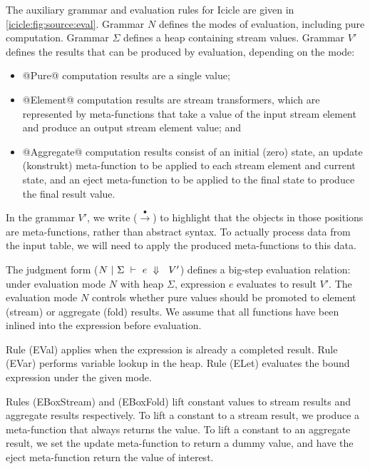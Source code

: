 The auxiliary grammar and evaluation rules for Icicle are given in \cref{icicle:fig:source:eval}.
Grammar $N$ defines the modes of evaluation, including pure computation.
Grammar $\Sigma$ defines a heap containing stream values.
Grammar $V'$ defines the results that can be produced by evaluation, depending on the mode:
\begin{itemize}
\item
@Pure@ computation results are a single value;
\item
@Element@ computation results are stream transformers, which are represented by meta-functions that take a value of the input stream element and produce an output stream element value; and
\item
@Aggregate@ computation results consist of an initial (zero) state, an update (konstrukt) meta-function to be applied to each stream element and current state, and an eject meta-function to be applied to the final state to produce the final result value.
\end{itemize}



In the grammar $V'$, we write ($\stackrel{\bullet}{\to}$) to highlight that the objects in those positions are meta-functions, rather than abstract syntax.
To actually process data from the input table, we will need to apply the produced meta-functions to this data.

The judgment form ($N~|~\Sigma~\vdash~e~\Downarrow~~V'$) defines a big-step evaluation relation: under evaluation mode $N$ with heap $\Sigma$, expression $e$ evaluates to result $V'$.
The evaluation mode $N$ controls whether pure values should be promoted to element (stream) or aggregate (fold) results. 
We assume that all functions have been inlined into the expression before evaluation.

Rule (EVal) applies when the expression is already a completed result.
Rule (EVar) performs variable lookup in the heap.
Rule (ELet) evaluates the bound expression under the given mode.



Rules (EBoxStream) and (EBoxFold) lift constant values to stream results and aggregate results respectively.
To lift a constant to a stream result, we produce a meta-function that always returns the value.
To lift a constant to an aggregate result, we set the update meta-function to return a dummy value, and have the eject meta-function return the value of interest.

